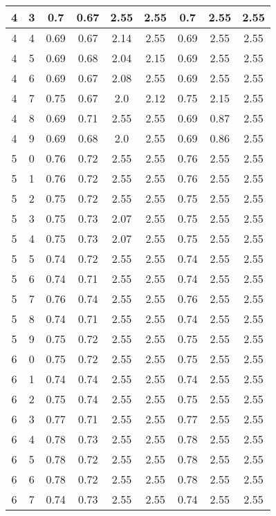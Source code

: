 \begin{longtable}{|c|c||c||c|c|c||c|c|c|}
	4 & 3 & 0.7 & 0.67 & 2.55 & 2.55 & 0.7 & 2.55 & 2.55 \\ \hline
	4 & 4 & 0.69 & 0.67 & 2.14 & 2.55 & 0.69 & 2.55 & 2.55 \\ \hline
	4 & 5 & 0.69 & 0.68 & 2.04 & 2.15 & 0.69 & 2.55 & 2.55 \\ \hline
	4 & 6 & 0.69 & 0.67 & 2.08 & 2.55 & 0.69 & 2.55 & 2.55 \\ \hline
	4 & 7 & 0.75 & 0.67 & 2.0 & 2.12 & 0.75 & 2.15 & 2.55 \\ \hline
	4 & 8 & 0.69 & 0.71 & 2.55 & 2.55 & 0.69 & 0.87 & 2.55 \\ \hline
	4 & 9 & 0.69 & 0.68 & 2.0 & 2.55 & 0.69 & 0.86 & 2.55 \\ \hline
	5 & 0 & 0.76 & 0.72 & 2.55 & 2.55 & 0.76 & 2.55 & 2.55 \\ \hline
	5 & 1 & 0.76 & 0.72 & 2.55 & 2.55 & 0.76 & 2.55 & 2.55 \\ \hline
	5 & 2 & 0.75 & 0.72 & 2.55 & 2.55 & 0.75 & 2.55 & 2.55 \\ \hline
	5 & 3 & 0.75 & 0.73 & 2.07 & 2.55 & 0.75 & 2.55 & 2.55 \\ \hline
	5 & 4 & 0.75 & 0.73 & 2.07 & 2.55 & 0.75 & 2.55 & 2.55 \\ \hline
	5 & 5 & 0.74 & 0.72 & 2.55 & 2.55 & 0.74 & 2.55 & 2.55 \\ \hline
	5 & 6 & 0.74 & 0.71 & 2.55 & 2.55 & 0.74 & 2.55 & 2.55 \\ \hline
	5 & 7 & 0.76 & 0.74 & 2.55 & 2.55 & 0.76 & 2.55 & 2.55 \\ \hline
	5 & 8 & 0.74 & 0.71 & 2.55 & 2.55 & 0.74 & 2.55 & 2.55 \\ \hline
	5 & 9 & 0.75 & 0.72 & 2.55 & 2.55 & 0.75 & 2.55 & 2.55 \\ \hline
	6 & 0 & 0.75 & 0.72 & 2.55 & 2.55 & 0.75 & 2.55 & 2.55 \\ \hline
	6 & 1 & 0.74 & 0.74 & 2.55 & 2.55 & 0.74 & 2.55 & 2.55 \\ \hline
	6 & 2 & 0.75 & 0.74 & 2.55 & 2.55 & 0.75 & 2.55 & 2.55 \\ \hline
	6 & 3 & 0.77 & 0.71 & 2.55 & 2.55 & 0.77 & 2.55 & 2.55 \\ \hline
	6 & 4 & 0.78 & 0.73 & 2.55 & 2.55 & 0.78 & 2.55 & 2.55 \\ \hline
	6 & 5 & 0.78 & 0.72 & 2.55 & 2.55 & 0.78 & 2.55 & 2.55 \\ \hline
	6 & 6 & 0.78 & 0.72 & 2.55 & 2.55 & 0.78 & 2.55 & 2.55 \\ \hline
	6 & 7 & 0.74 & 0.73 & 2.55 & 2.55 & 0.74 & 2.55 & 2.55 \\ \hline

\end{longtable}
